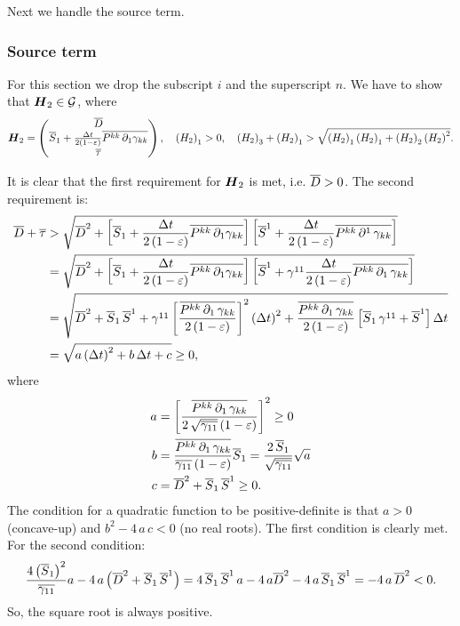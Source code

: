 \documentclass[10pt,preprint]{aastex}
\begin{document}
Next we handle the source term.

\subsubsection{Source term}
For this section we drop the subscript $i$ and the superscript $n$. We have to show that $\bH_{2}\in\cG$, where
\begin{equation}
    \bH_{2}=\begin{pmatrix}\ol{D}\\ \ol{S}_{1}+\f{\Delta t}{2\left(1-\ve\right)}\ol{P^{kk}\,\pd{\gamma_{kk}}{1}} \\ \ol{\tau}\end{pmatrix},\hspace{1em}\left(H_{2}\right)_{1}>0,\hspace{1em}\left(H_{2}\right)_{3}+\left(H_{2}\right)_{1}>\sqrt{\left(H_{2}\right)_{1}\left(H_{2}\right)_{1}+\left(H_{2}\right)_{2}\left(H_{2}\right)^{2}}.
\end{equation}

It is clear that the first requirement for $\bH_{2}$ is met, i.e. $\ol{D}>0$. The second requirement is:
\begin{align}
\ol{D}+\ol{\tau}&>\sqrt{\ol{D}^{2}+\left[\ol{S}_{1}+\f{\Delta t}{2\left(1-\ve\right)}\ol{P^{kk}\,\pd{\gamma_{kk}}{1}}\right] \left[\ol{S}^{1}+\f{\Delta t}{2\left(1-\ve\right)}\ol{P^{kk}\,\p^{1}\,\gamma_{kk}}\right] }\\
&=\sqrt{\ol{D}^{2}+\left[\ol{S}_{1}+\f{\Delta t}{2\left(1-\ve\right)}\ol{P^{kk}\,\pd{\gamma_{kk}}{1}}\right] \left[\ol{S}^{1}+\gamma^{11}\f{\Delta t}{2\left(1-\ve\right)}\ol{P^{kk}\,\p_{1}\,\gamma_{kk}}\right] }\\
&=\sqrt{\ol{D}^{2}+\ol{S}_{1}\,\ol{S}^{1}+\gamma^{11}\left[\f{\ol{P^{kk}\,\p_{1}\,\gamma_{kk}}}{2\left(1-\ve\right)}\right]^{2}\left(\Delta t\right)^{2}+\f{\ol{P^{kk}\,\p_{1}\,\gamma_{kk}}}{2\left(1-\ve\right)}\left[\ol{S}_{1}\,\gamma^{11}+\ol{S}^{1}\right]\Delta t}\\
&=\sqrt{a\left(\Delta t\right)^{2}+b\,\Delta t+c}\geq0,
\end{align}
where
\begin{align}
    a&=\left[\f{\ol{P^{kk}\,\p_{1}\,\gamma_{kk}}}{2\,\sqrt{\ol{\gamma_{11}}}\left(1-\ve\right)}\right]^{2}\geq0\\
    b&=\f{\ol{P^{kk}\,\p_{1}\,\gamma_{kk}}}{\ol{\gamma_{11}}\left(1-\ve\right)}\ol{S}_{1}=\f{2\,\ol{S}_{1}}{\sqrt{\ol{\gamma_{11}}}}\sqrt{a}\\
    c&=\ol{D}^{2}+\ol{S}_{1}\,\ol{S}^{1}\geq0.
\end{align}
The condition for a quadratic function to be positive-definite is that $a>0$ (concave-up) and $b^{2}-4\,a\,c<0$ (no real roots). The first condition is clearly met. For the second condition:
\begin{equation}
    \f{4\left(\ol{S}_{1}\right)^{2}}{\ol{\gamma_{11}}}a-4\,a\left(\ol{D}^{2}+\ol{S}_{1}\,\ol{S}^{1}\right)=4\,\ol{S}_{1}\,\ol{S}^{1}\,a-4\,a\ol{D}^{2}-4\,a\,\ol{S}_{1}\,\ol{S}^{1}=-4\,a\,\ol{D}^{2}<0.
\end{equation}
So, the square root is always positive.
\end{document}
